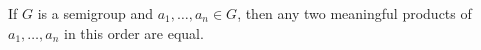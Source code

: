 \begin{theorem}
If $G$ is a semigroup and $a_1, \ldots, a_n \in G$, then any two meaningful products of $a_1, \ldots, a_n$ in this order are equal.
\end{theorem}
